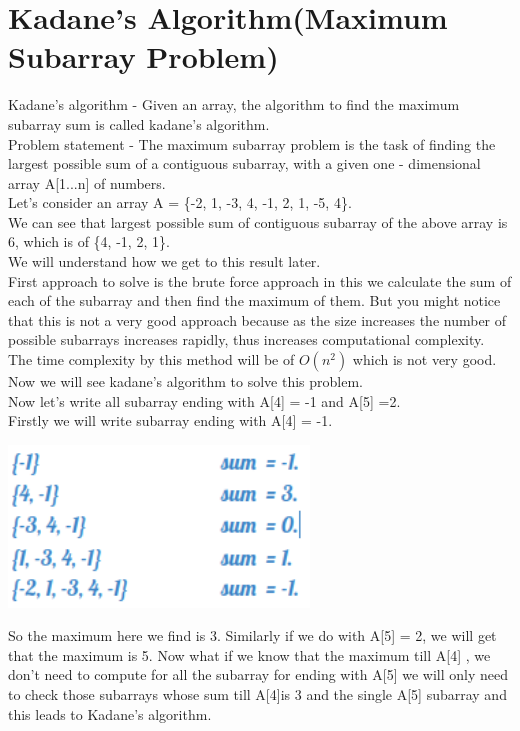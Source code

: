 \documentclass[12pt]{book}
\begin{document}
\chapter{Kadane’s Algorithm(Maximum Subarray Problem)}
Kadane’s algorithm - Given an array, the algorithm to find the maximum subarray sum is called kadane's algorithm.\\
\newline
Problem statement - The maximum subarray problem is the task of finding the largest possible sum of a contiguous subarray, with a given one - dimensional array A[1...n] of numbers.\\
\newline
Let’s consider an array A = \{-2, 1, -3, 4, -1, 2, 1, -5, 4\}.\\
\newline
We can see that largest possible sum of contiguous subarray of the above array is 6, which is of \{4, -1, 2, 1\}.\\
\newline
We will understand how we get to this result later.\\
\newline
First approach to solve is the brute force approach in this we calculate the sum of each of the subarray and then find the maximum of them. But you might notice that this is not a very good approach because as the size increases the number of possible subarrays increases rapidly, thus increases computational complexity. The time complexity by this method will be of $O(n^2)$ which is not very good.\\
\newline
Now we will see kadane’s algorithm to solve this problem.\\
Now let’s write all subarray ending with A[4] = -1 and A[5] =2.\\
Firstly we will write subarray ending with A[4] = -1.\\
\begin{center}
    \includegraphics[width =8cm]{HJvIqJn.png}    
\end{center}
So the maximum here we find is 3. Similarly if we do with A[5] = 2, we will get that the maximum is 5. Now what if we know that the maximum till A[4] , we don’t need to compute for all the subarray for ending with A[5] we will only need to check those subarrays whose sum till A[4]is 3 and the single A[5] subarray and this leads to Kadane’s algorithm.\\
\end{document}
